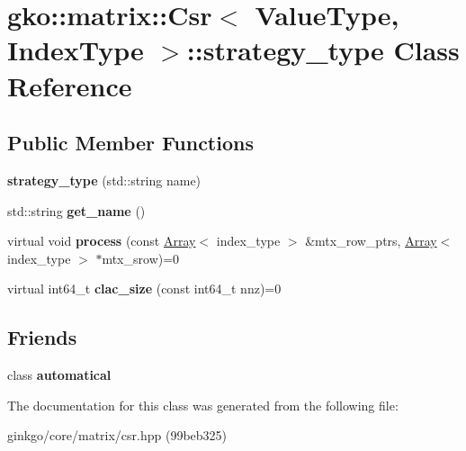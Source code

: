 \hypertarget{classgko_1_1matrix_1_1Csr_1_1strategy__type}{}\section{gko\+:\+:matrix\+:\+:Csr$<$ Value\+Type, Index\+Type $>$\+:\+:strategy\+\_\+type Class Reference}
\label{classgko_1_1matrix_1_1Csr_1_1strategy__type}
\subsection*{Public Member Functions}
\begin{DoxyCompactItemize}
\item 
\mbox{\label{classgko_1_1matrix_1_1Csr_1_1strategy__type_aae6804f7a0b899f03bc0d5e0f139129c}} 
{\bfseries strategy\+\_\+type} (std\+::string name)
\item 
\mbox{\label{classgko_1_1matrix_1_1Csr_1_1strategy__type_a0c22b251b0c1dfd087a5c097488febe0}} 
std\+::string {\bfseries get\+\_\+name} ()
\item 
\mbox{\label{classgko_1_1matrix_1_1Csr_1_1strategy__type_a58bda9208766e57d861262d4059b65b4}} 
virtual void {\bfseries process} (const \hyperlink{classgko_1_1Array}{Array}$<$ index\+\_\+type $>$ \&mtx\+\_\+row\+\_\+ptrs, \hyperlink{classgko_1_1Array}{Array}$<$ index\+\_\+type $>$ $\ast$mtx\+\_\+srow)=0
\item 
\mbox{\label{classgko_1_1matrix_1_1Csr_1_1strategy__type_a07a6dda9dd04ed8abd914f3a69f330f2}} 
virtual int64\+\_\+t {\bfseries clac\+\_\+size} (const int64\+\_\+t nnz)=0
\end{DoxyCompactItemize}
\subsection*{Friends}
\begin{DoxyCompactItemize}
\item 
\mbox{\label{classgko_1_1matrix_1_1Csr_1_1strategy__type_a9e1e07b9f14479534a4043eefd6320cc}} 
class {\bfseries automatical}
\end{DoxyCompactItemize}


The documentation for this class was generated from the following file\+:\begin{DoxyCompactItemize}
\item 
ginkgo/core/matrix/csr.\+hpp (99beb325)\end{DoxyCompactItemize}
